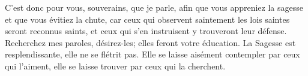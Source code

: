 C’est donc pour vous, souverains, que je parle,
	afin que vous appreniez la sagesse et que vous évitiez la chute,
	car ceux qui observent saintement les lois saintes seront reconnus saints,
	et ceux qui s’en instruisent y trouveront leur défense.
Recherchez mes paroles, désirez-les; elles feront votre éducation.
La Sagesse est resplendissante, elle ne se flétrit pas.
	Elle se laisse aisément contempler par ceux qui l’aiment,
	elle se laisse trouver par ceux qui la cherchent.
